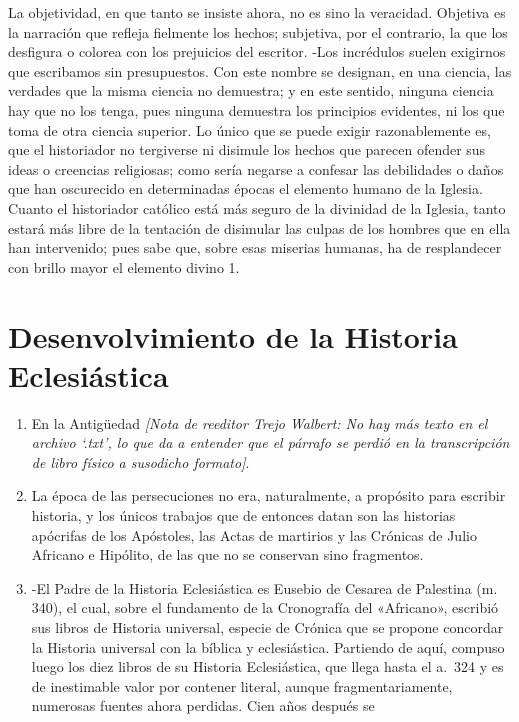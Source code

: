 \raggedbottom{} \documentclass[12pt, a4paper]{book}
\begin{document}
La objetividad, en que tanto se insiste ahora, no es sino la veracidad. Objetiva es la narración que refleja fielmente los hechos; subjetiva, por el contrario, la que los desfigura o colorea con los prejuicios del escritor. -Los incrédulos suelen exigirnos que escribamos sin presupuestos. Con este nombre se designan, en una ciencia, las verdades que la misma ciencia no demuestra; y en este sentido, ninguna ciencia hay que no los tenga, pues ninguna demuestra los principios evidentes, ni los que toma de otra ciencia superior. Lo único que se puede exigir razonablemente es, que el historiador no tergiverse ni disimule los hechos que parecen ofender sus ideas o creencias religiosas; como sería negarse a confesar las debilidades o daños que han oscurecido en determinadas épocas el elemento humano de la Iglesia. Cuanto el historiador católico está más seguro de la divinidad de la Iglesia, tanto estará más libre de la tentación de disimular las culpas de los hombres que en ella han intervenido; pues sabe que, sobre esas miserias humanas, ha de resplandecer con brillo mayor el elemento divino 1.
\section{Desenvolvimiento de la Historia Eclesiástica}
\begin{enumerate}
  \item En la Antigüedad \textit{[Nota de reeditor Trejo Walbert: No hay más texto en el archivo `.txt', lo que da a entender que el párrafo se perdió en la transcripción de libro físico a susodicho formato]}.
  \item La época de las persecuciones no era, naturalmente, a propósito para escribir historia, y los únicos trabajos que de entonces datan son las historias apócrifas de los Apóstoles, las Actas de martirios y las Crónicas de Julio Africano e Hipólito, de las que no se conservan sino fragmentos.
  \item -El Padre de la Historia Eclesiástica es Eusebio de Cesarea de Palestina (m. 340), el cual, sobre el fundamento de la Cronografía del «Africano», escribió sus libros de Historia universal, especie de Crónica que se propone concordar la Historia universal con la bíblica y eclesiástica. Partiendo de aquí, compuso luego los diez libros de su Historia Eclesiástica, que llega hasta el a.\ 324 y es de inestimable valor por contener literal, aunque fragmentariamente, numerosas fuentes ahora perdidas. Cien años después se
\end{enumerate}
\end{document}
